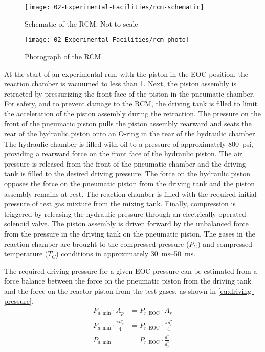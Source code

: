 \documentclass[../main.tex]{subfiles}
\begin{document}
\begin{sidewaysfigure}
\texttt{[image: 02-Experimental-Facilities/rcm-schematic]}
\caption{Schematic of the RCM. Not to scale}
\label{fig:rcm-schematic}
\end{sidewaysfigure}

\begin{figure}
\texttt{[image: 02-Experimental-Facilities/rcm-photo]}
\caption{Photograph of the RCM.}\label{fig:rcm-photo}
\end{figure}

At the start of an experimental run, with the piston in the
EOC position, the reaction chamber is vacuumed to less
than \SI{1}{\torr}. Next, the piston assembly is retracted by pressurizing
the front face of the piston in the pneumatic chamber.
For safety, and to prevent damage to the RCM, the driving tank is
filled to limit the acceleration of the piston assembly during the
retraction.
The pressure on the front of the pneumatic piston pulls the
piston assembly rearward and seats the rear of the
hydraulic piston onto an O-ring in the rear of the
hydraulic chamber. The hydraulic chamber is filled with oil to
a pressure of approximately \SI{800}{psi}, providing a rearward force on the
front face of the hydraulic piston. The air pressure is released from
the front of the pneumatic chamber and the driving tank is filled to
the desired driving pressure. The
force on the hydraulic piston opposes the force on the pneumatic piston
from the driving tank and the piston assembly remains at rest. The
reaction chamber is filled with the required initial pressure of test
gas mixture from the mixing tank. Finally, compression is triggered by
releasing the hydraulic pressure through an electrically-operated solenoid
valve. The piston assembly is driven forward by the unbalanced force from
the pressure in the driving tank on the pneumatic piston. The gases
in the reaction chamber are brought to the compressed pressure ($P_C$) and
compressed temperature ($T_C$) conditions in approximately
\SIrange{30}{50}{\milli\second}.

The required driving pressure for a given EOC pressure can be estimated
from a force balance between the force on the pneumatic piston from the
driving tank and the force on the reactor piston from the test gases,
as shown in \cref{eq:driving-pressure}.
%
\begin{subequations}
\label{eq:piston-force}
\begin{align}
    P_{d,\text{min}} \cdot A_p &= P_{r,\text{EOC}} \cdot A_r \\
    P_{d,\text{min}} \cdot \frac{\pi d_p^2}{4} &= P_{r,\text{EOC}} \cdot \frac{\pi d_r^2}{4} \\
    P_{d,\text{min}} &= P_{r,\text{EOC}} \cdot \frac{d_r^2}{d_p^2} \label{eq:driving-pressure}
\end{align}
\end{subequations}
\end{document}
